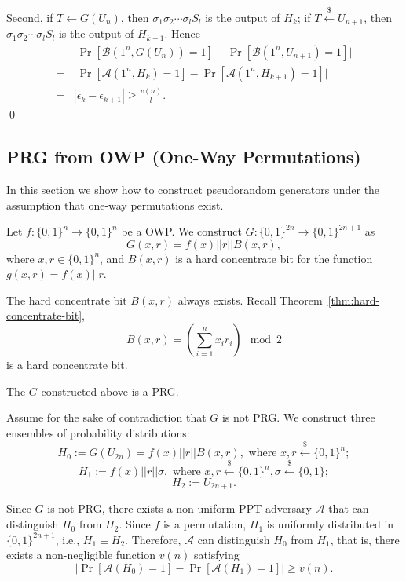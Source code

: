 \documentclass[12pt]{tufte-book}
\newcommand{\ma}{\mathcal{A}}
\begin{document}
Second, if $T\gets G(U_n)$, then $\sigma_1 \sigma_2 \cdots \sigma_l S_l$ is the output of  $H_{k}$; if $T \stackrel{\$}\leftarrow U_{n+1}$, then $\sigma_1 \sigma_2 \cdots \sigma_l S_l$ is the output of $H_{k+1}$.
Hence
\begin{align*}
&\big|\Pr[\mathcal{B}(1^n, G(U_n)) = 1] - \Pr[\mathcal{B}(1^n, U_{n+1}) = 1]\big|\\
=& \big|\Pr[\ma(1^n,H_k) = 1] - \Pr[\ma(1^n,H_{k+1}) = 1]\big|\\
=&
|\epsilon_{k} - \epsilon_{k+1}| \geq \frac{v(n)}{l}.
\end{align*}
\qed

\subsection{PRG from OWP (One-Way Permutations)}
In this section we show how to construct pseudorandom generators under the assumption that one-way permutations exist.

\begin{construction}
Let $f: \{0, 1\}^n \rightarrow \{0, 1\}^n$ be a OWP. We construct $G: \{0, 1\}^{2n} \rightarrow \{0, 1\}^{2n+1}$ as
\[
G(x, r) = f(x) || r || B(x, r),
\]
where $x, r \in \{0, 1\}^n$, and $B(x, r)$ is a hard concentrate bit for the function $g(x,r) = f(x) || r$.
\end{construction}

\begin{remark}
The hard concentrate bit $B(x,r)$ always exists. Recall Theorem~\ref{thm:hard-concentrate-bit},
\[B(x,r) = \left(\sum_{i=1}^n x_i r_i\right)\mod 2\]
is a hard concentrate bit.
\end{remark}

\begin{theorem}
The $G$ constructed above is a PRG.
\end{theorem}

\proof
Assume for the sake of contradiction that $G$ is not PRG.
We construct three ensembles of probability distributions:
\[H_0 := G(U_{2n}) = f(x) || r || B(x, r), \text{ where } x, r \xleftarrow{\$} \{0, 1\}^n;\]
\[H_1 := f(x) || r || \sigma, \text{ where } x, r \xleftarrow{\$} \{0, 1\}^n, \sigma \xleftarrow{\$} \{0, 1\};\]
\[H_2 := U_{2n+1}.\]

Since $G$ is not PRG, there exists a non-uniform PPT adversary $\ma$ that can distinguish $H_0$ from $H_2$.
Since $f$ is a permutation, $H_1$ is uniformly distributed in $\{0, 1\}^{2n+1}$, i.e., $H_1 \equiv H_2$.
Therefore, $\ma$ can distinguish $H_0$ from $H_1$,
that is, there exists a non-negligible function $v(n)$ satisfying
\[
\big| \Pr[\ma(H_0)=1] - \Pr[\ma(H_1)=1] \big| \geq v(n).
\]
\end{document}
